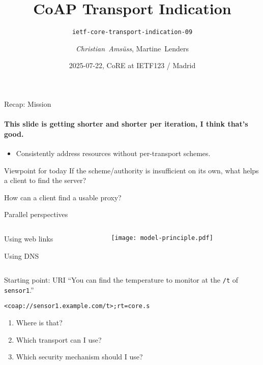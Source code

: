 

\title{CoAP Transport Indication}
\subtitle{\texttt{ietf-core-transport-indication-09}}
\author{\textit{Christian~Amsüss}, Martine~Lenders}
\date{2025-07-22, CoRE at IETF123 / Madrid}



\frame{\titlepage}

\begin{frame}{Recap: Mission}\framesubtitle{\footnotesize This slide is getting shorter and shorter per iteration, I think that's good.}\Large
    \begin{itemize}
        \item Consistently address resources without per-transport schemes.
    \end{itemize}
\end{frame}

\begin{frame}{Viewpoint for today}\Large
    If the scheme/authority is insufficient on its own, what helps a client to find the server?

    \vspace{2cm}

    How can a client find a usable proxy?
\end{frame}

\begin{frame}{Parallel perspectives}\Large
    \begin{columns}
        \begin{column}{0.7\textwidth}
            Using web links
           
            \vspace{2cm}

            Using DNS
        \end{column}
        \begin{column}{0.3\textwidth}
            \texttt{[image: model-principle.pdf]}
        \end{column}
    \end{columns}
\end{frame}

\begin{frame}{Starting point: URI}\Large
    ``You can find the temperature to monitor at the \texttt{/t} of \texttt{sensor1}.''

    \vspace{1cm}

    \texttt{<coap://sensor1.example.com/t>;rt=core.s}

    \vspace{1cm}

    \begin{enumerate}
        \item Where is that?
        \item Which transport can I use?
        \item Which security mechanism should I use?
    \end{enumerate}
\end{frame}

